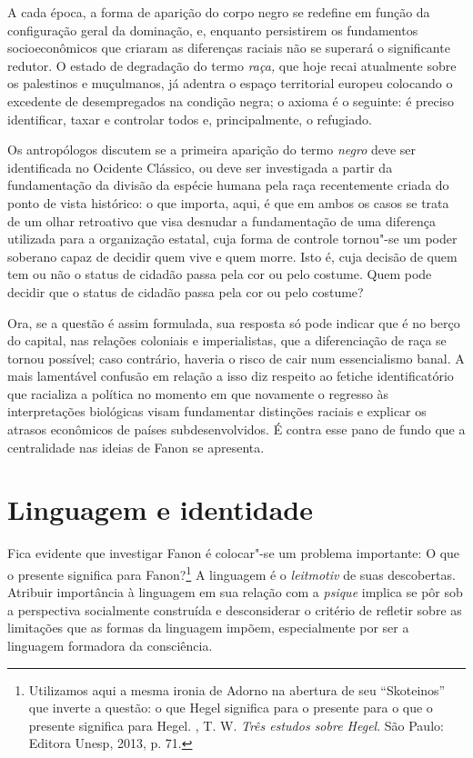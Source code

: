 A cada época, a forma de aparição do corpo negro se redefine em função
da configuração geral da dominação, e, enquanto persistirem os
fundamentos socioeconômicos que criaram as diferenças raciais não se
superará o significante redutor. O estado de degradação do termo
\emph{raça,} que hoje recai atualmente sobre os palestinos e muçulmanos,
já adentra o espaço territorial europeu colocando o excedente de
desempregados na condição negra; o axioma é o seguinte: é preciso
identificar, taxar e controlar todos e, principalmente, o refugiado.

Os antropólogos discutem se a primeira aparição do termo \emph{negro}
deve ser identificada no Ocidente Clássico, ou deve ser investigada a
partir da fundamentação da divisão da espécie humana pela raça
recentemente criada do ponto de vista histórico: o que importa, aqui, é
que em ambos os casos se trata de um olhar retroativo que visa desnudar
a fundamentação de uma diferença utilizada para a organização estatal,
cuja forma de controle tornou"-se um poder soberano capaz de decidir quem
vive e quem morre. Isto é, cuja decisão de quem tem ou não o status de
cidadão passa pela cor ou pelo costume. Quem pode decidir que o status
de cidadão passa pela cor ou pelo costume?

Ora, se a questão é assim formulada, sua resposta só pode indicar que é
no berço do capital, nas relações coloniais e imperialistas, que a
diferenciação de raça se tornou possível; caso contrário, haveria o
risco de cair num essencialismo banal. A mais lamentável confusão em
relação a isso diz respeito ao fetiche identificatório que racializa a
política no momento em que novamente o regresso às interpretações
biológicas visam fundamentar distinções raciais e explicar os atrasos
econômicos de países subdesenvolvidos. É contra esse pano de fundo que a
centralidade nas ideias de Fanon se apresenta.

\chapter{Linguagem e identidade}

Fica evidente que investigar Fanon é colocar"-se um problema importante:
O que o presente significa para Fanon?\footnote{Utilizamos aqui a mesma
  ironia de Adorno na abertura de seu ``Skoteinos'' que inverte a questão: o
  que Hegel significa para o presente para o que o presente significa
  para Hegel. , T. W. \emph{Três estudos sobre Hegel}. São Paulo:
  Editora Unesp, 2013, p. 71.} A linguagem é o \emph{leitmotiv} de suas
descobertas. Atribuir importância à linguagem em sua relação com a
\emph{psique} implica se pôr sob a perspectiva socialmente construída e
desconsiderar o critério de refletir sobre as limitações que as formas
da linguagem impõem, especialmente por ser a linguagem formadora da
consciência.

